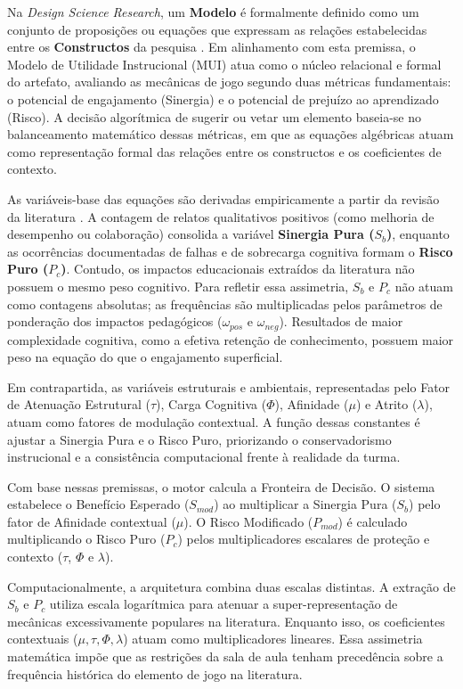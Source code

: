 Na \textit{Design Science Research}, um \textbf{Modelo} é formalmente definido como um conjunto de proposições ou equações que expressam as relações estabelecidas entre os \textbf{Constructos} da pesquisa \cite{march1995design, dresch2014design}. Em alinhamento com esta premissa, o Modelo de Utilidade Instrucional (MUI) atua como o núcleo relacional e formal do artefato, avaliando as mecânicas de jogo segundo duas métricas fundamentais: o potencial de engajamento (Sinergia) e o potencial de prejuízo ao aprendizado (Risco). A decisão algorítmica de sugerir ou vetar um elemento baseia-se no balanceamento matemático dessas métricas, em que as equações algébricas atuam como representação formal das relações entre os constructos e os coeficientes de contexto.

As variáveis-base das equações são derivadas empiricamente a partir da revisão da literatura \cite{terciario2023}. A contagem de relatos qualitativos positivos (como melhoria de desempenho ou colaboração) consolida a variável \textbf{Sinergia Pura ($S_b$)}, enquanto as ocorrências documentadas de falhas e de sobrecarga cognitiva formam o \textbf{Risco Puro ($P_c$)}. Contudo, os impactos educacionais extraídos da literatura não possuem o mesmo peso cognitivo. Para refletir essa assimetria, $S_b$ e $P_c$ não atuam como contagens absolutas; as frequências são multiplicadas pelos parâmetros de ponderação dos impactos pedagógicos ($\omega_{pos}$ e $\omega_{neg}$). Resultados de maior complexidade cognitiva, como a efetiva retenção de conhecimento, possuem maior peso na equação do que o engajamento superficial.

Em contrapartida, as variáveis estruturais e ambientais, representadas pelo Fator de Atenuação Estrutural ($\tau$), Carga Cognitiva ($\Phi$), Afinidade ($\mu$) e Atrito ($\lambda$), atuam como fatores de modulação contextual. A função dessas constantes é ajustar a Sinergia Pura e o Risco Puro, priorizando o conservadorismo instrucional e a consistência computacional frente à realidade da turma.

Com base nessas premissas, o motor calcula a Fronteira de Decisão. O sistema estabelece o Benefício Esperado ($S_{mod}$) ao multiplicar a Sinergia Pura ($S_b$) pelo fator de Afinidade contextual ($\mu$). O Risco Modificado ($P_{mod}$) é calculado multiplicando o Risco Puro ($P_c$) pelos multiplicadores escalares de proteção e contexto ($\tau$, $\Phi$ e $\lambda$). 

Computacionalmente, a arquitetura combina duas escalas distintas. A extração de $S_b$ e $P_c$ utiliza escala logarítmica para atenuar a super-representação de mecânicas excessivamente populares na literatura. Enquanto isso, os coeficientes contextuais ($\mu, \tau, \Phi, \lambda$) atuam como multiplicadores lineares. Essa assimetria matemática impõe que as restrições da sala de aula tenham precedência sobre a frequência histórica do elemento de jogo na literatura.

